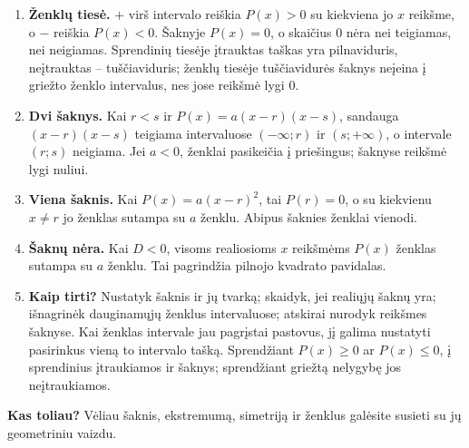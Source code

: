 \documentclass[12pt,a4paper]{article}
\begin{document}
\begin{tcolorbox}[title=Svarbiausios temos išvados,colback=black!3,colframe=black!65,boxrule=0.6pt,arc=2mm]
\begin{enumerate}
\item \textbf{Ženklų tiesė.} $+$ virš intervalo reiškia $P(x)>0$ su kiekviena jo $x$ reikšme, o $-$ reiškia $P(x)<0$. Šaknyje $P(x)=0$, o skaičius $0$ nėra nei teigiamas, nei neigiamas. Sprendinių tiesėje įtrauktas taškas yra pilnaviduris, neįtrauktas – tuščiaviduris; ženklų tiesėje tuščiavidurės šaknys neįeina į griežto ženklo intervalus, nes jose reikšmė lygi $0$.
\item \textbf{Dvi šaknys.} Kai $r<s$ ir $P(x)=a(x-r)(x-s)$, sandauga $(x-r)(x-s)$ teigiama intervaluose $(-\infty;r)$ ir $(s;+\infty)$, o intervale $(r;s)$ neigiama. Jei $a<0$, ženklai pasikeičia į priešingus; šaknyse reikšmė lygi nuliui.
\item \textbf{Viena šaknis.} Kai $P(x)=a(x-r)^2$, tai $P(r)=0$, o su kiekvienu $x\ne r$ jo ženklas sutampa su $a$ ženklu. Abipus šaknies ženklai vienodi.
\item \textbf{Šaknų nėra.} Kai $D<0$, visoms realiosioms $x$ reikšmėms $P(x)$ ženklas sutampa su $a$ ženklu. Tai pagrindžia pilnojo kvadrato pavidalas.
\item \textbf{Kaip tirti?} Nustatyk šaknis ir jų tvarką; skaidyk, jei realiųjų šaknų yra; išnagrinėk dauginamųjų ženklus intervaluose; atskirai nurodyk reikšmes šaknyse. Kai ženklas intervale jau pagrįstai pastovus, jį galima nustatyti pasirinkus vieną to intervalo tašką. Sprendžiant $P(x)\ge0$ ar $P(x)\le0$, į sprendinius įtraukiamos ir šaknys; sprendžiant griežtą nelygybę jos neįtraukiamos.
\end{enumerate}
\end{tcolorbox}
\textbf{Kas toliau?} Vėliau šaknis, ekstremumą, simetriją ir ženklus galėsite susieti su jų geometriniu vaizdu.
\end{document}
